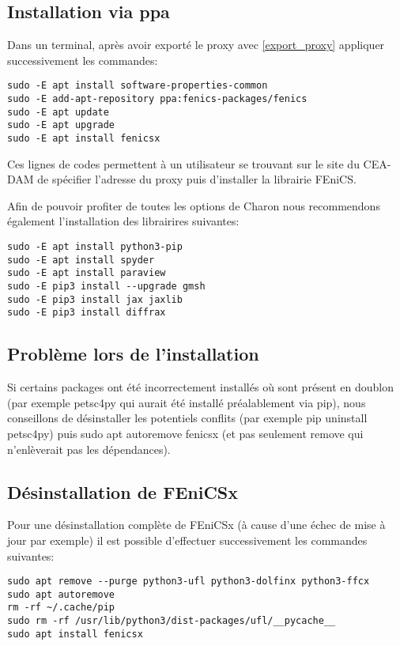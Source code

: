 \documentclass[10pt]{book}
\begin{document}
\subsection{Installation via ppa}\label{Subsection:ppa}
Dans un terminal, après avoir exporté le proxy avec \eqref{export_proxy} appliquer successivement les commandes:
\begin{verbatim}
sudo -E apt install software-properties-common
sudo -E add-apt-repository ppa:fenics-packages/fenics
sudo -E apt update
sudo -E apt upgrade
sudo -E apt install fenicsx
\end{verbatim}
Ces lignes de codes permettent à un utilisateur se trouvant sur le site du CEA-DAM de spécifier l'adresse du proxy puis d'installer la librairie FEniCS.

Afin de pouvoir profiter de toutes les options de Charon nous recommendons également l'installation des librairires suivantes:
\begin{verbatim}
sudo -E apt install python3-pip
sudo -E apt install spyder
sudo -E apt install paraview
sudo -E pip3 install --upgrade gmsh
sudo -E pip3 install jax jaxlib
sudo -E pip3 install diffrax
\end{verbatim}
\subsection{Problème lors de l'installation}
Si certains packages ont été incorrectement installés où sont présent en doublon (par exemple petsc4py qui aurait été installé préalablement via pip), nous conseillons de désinstaller les potentiels conflits (par exemple pip uninstall petsc4py) puis sudo apt autoremove fenicsx (et pas seulement remove qui n'enlèverait pas les dépendances).
\subsection{Désinstallation de FEniCSx}
Pour une désinstallation complète de FEniCSx (à cause d'une échec de mise à jour par exemple) il est possible d'effectuer successivement les commandes suivantes:
\begin{verbatim}
sudo apt remove --purge python3-ufl python3-dolfinx python3-ffcx
sudo apt autoremove
rm -rf ~/.cache/pip
sudo rm -rf /usr/lib/python3/dist-packages/ufl/__pycache__
sudo apt install fenicsx
\end{verbatim}
\end{document}
